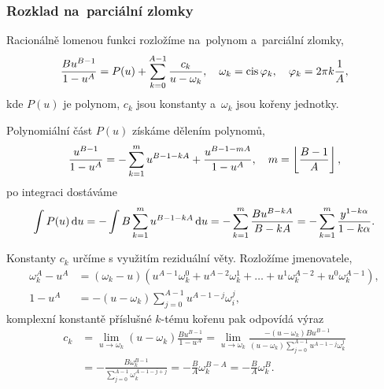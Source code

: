 
\subsubsection{Rozklad na~parciální zlomky}\label{sss:rozklad_na_parcialni_zlomky}
Racionálně lomenou funkci rozložíme na~polynom a~parciální zlomky,
\begin{equation}
    \frac{Bu^{B-1}}{1-u^A}=P(u)+\sum_{k=0}^{A-1}\frac{c_k}{u-\omega_k},\quad \omega_k=\operatorname{cis}{\varphi_k},\quad \varphi_k=2\pi k\frac{1}{A},
\end{equation}
kde $P(u)$ je polynom, $c_k$ jsou konstanty a~$\omega_k$ jsou kořeny jednotky.

Polynomiální část $P(u)$ získáme dělením polynomů,
\begin{equation}
    \frac{u^{B-1}}{1-u^A}=-\sum_{k=1}^{m}u^{B-1-kA}+\frac{u^{B-1-mA}}{1-u^A},\quad m=\left\lfloor\frac{B-1}{A}\right\rfloor,
\end{equation}
po integraci dostáváme
\begin{equation}\label{eq:solution_polynomial}
    \int P(u)\,\mathrm{d}{u}=-\int B\sum_{k=1}^{m}u^{B-1-kA} \,\mathrm{d}{u} = -\sum_{k=1}^{m}\frac{Bu^{B-kA}}{B-kA}=-\sum_{k=1}^{m}\frac{y^{1-k\alpha}}{1-k\alpha}.
\end{equation}

Konstanty $c_k$ určíme s využitím reziduální věty. Rozložíme jmenovatele,
\begin{subequations}
\begin{align}
    \omega_k^A-u^A&=(\omega_k-u)\left(u^{A-1}\omega_k^0+u^{A-2}\omega_k^1+\dots+u^1\omega_k^{A-2}+u^0\omega_k^{A-1}\right),\\
    1-u^A&=-(u-\omega_k)\sum_{j=0}^{A-1}u^{A-1-j}\omega_i^j,
\end{align}
\end{subequations}
komplexní konstantě příslušné $k$-tému kořenu pak odpovídá výraz
\begin{align}
    c_k&=\lim_{u\to \omega_k}(u-\omega_k)\frac{Bu^{B-1}}{1-u^A}=\lim_{u\to \omega_k}\frac{-(u-\omega_k)Bu^{B-1}}{\left(u-\omega_k\right)\sum_{j=0}^{A-1}u^{A-1-j}\omega_k^j}\nonumber\\
    &=-\frac{B\omega_k^{B-1}}{\sum_{j=0}^{A-1}{\omega_k^{A-1-j+j}}}=-\frac{B}{A}\omega_k^{B-A}=-\frac{B}{A}\omega_{k}^B.
\end{align}

